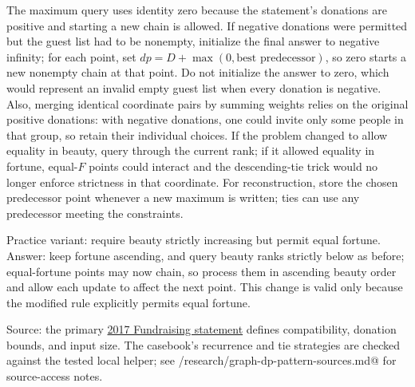 The maximum query uses identity zero because the statement's donations are
positive and starting a new chain is allowed. If negative donations were
permitted but the guest list had to be nonempty, initialize the final answer
to negative infinity; for each point, set $dp=D+\max(0,\text{best
predecessor})$, so zero starts a new nonempty chain at that point. Do not
initialize the answer to zero, which would represent an invalid empty guest
list when every donation is negative. Also, merging identical coordinate
pairs by summing weights relies on the original positive donations: with
negative donations, one could invite only some people in that group, so
retain their individual choices. If the problem changed to allow equality in beauty,
query through the current rank; if it allowed equality in fortune, equal-$F$
points could interact and the descending-tie trick would no longer enforce
strictness in that coordinate. For reconstruction, store the chosen
predecessor point whenever a new maximum is written; ties can use any
predecessor meeting the constraints.

Practice variant: require beauty strictly increasing but permit equal
fortune. Answer: keep fortune ascending, and query beauty ranks strictly
below as before; equal-fortune points may now chain, so process them in
ascending beauty order and allow each update to affect the next point. This
change is valid only because the modified rule explicitly permits equal
fortune.

Source: the primary \href{https://maratona.ime.usp.br/hist/2017/resultados/contest.pdf}{2017 Fundraising statement} defines compatibility, donation bounds, and input size. The casebook's recurrence and tie strategies are checked against the tested local helper; see \verb@handbooks/research/graph-dp-pattern-sources.md@ for source-access notes.
